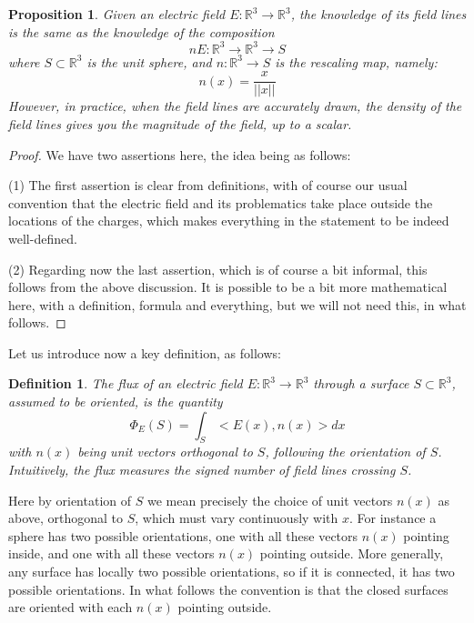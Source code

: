 \documentclass[12pt]{amsbook}
\newtheorem{definition}[theorem]{Definition}
\newtheorem{proposition}[theorem]{Proposition}
\begin{document}
\begin{proposition}
Given an electric field $E:\mathbb R^3\to\mathbb R^3$, the knowledge of its field lines is the same as the knowledge of the composition
$$nE:\mathbb R^3\to\mathbb R^3\to S$$
where $S\subset\mathbb R^3$ is the unit sphere, and $n:\mathbb R^3\to S$ is the rescaling map, namely:
$$n(x)=\frac{x}{||x||}$$
However, in practice, when the field lines are accurately drawn, the density of the field lines gives you the magnitude of the field, up to a scalar.
\end{proposition}

\begin{proof}
We have two assertions here, the idea being as follows:

\medskip

(1) The first assertion is clear from definitions, with of course our usual convention that the electric field and its problematics take place outside the locations of the charges, which makes everything in the statement to be indeed well-defined. 

\medskip

(2) Regarding now the last assertion, which is of course a bit informal, this follows from the above discussion. It is possible to be a bit more mathematical here, with a definition, formula and everything, but we will not need this, in what follows.
\end{proof}

Let us introduce now a key definition, as follows:

\begin{definition}
The flux of an electric field $E:\mathbb R^3\to\mathbb R^3$ through a surface $S\subset\mathbb R^3$, assumed to be oriented, is the quantity
$$\Phi_E(S)=\int_S<E(x),n(x)>dx$$
with $n(x)$ being unit vectors orthogonal to $S$, following the orientation of $S$. Intuitively, the flux measures the signed number of field lines crossing $S$.
\end{definition}

Here by orientation of $S$ we mean precisely the choice of unit vectors $n(x)$ as above, orthogonal to $S$, which must vary continuously with $x$. For instance a sphere has two possible orientations, one with all these vectors $n(x)$ pointing inside, and one with all these vectors $n(x)$ pointing outside. More generally, any surface has locally two possible orientations, so if it is connected, it has two possible orientations. In what follows the convention is that the closed surfaces are oriented with each $n(x)$ pointing outside.
\end{document}
